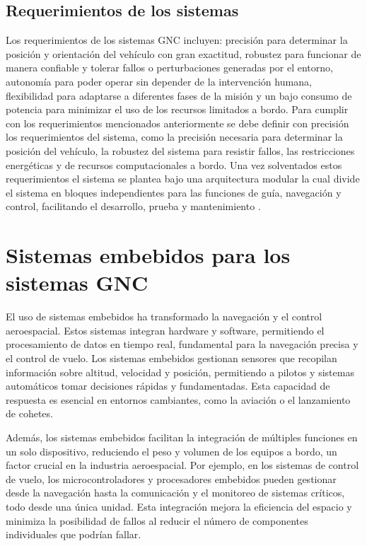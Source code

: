 \subsection{Requerimientos de los sistemas}

Los requerimientos de los sistemas GNC incluyen: precisión para determinar la posición y orientación del vehículo con gran exactitud, robustez para funcionar de manera confiable y tolerar fallos o perturbaciones generadas por el entorno, autonomía para poder operar sin depender de la intervención humana, flexibilidad para adaptarse a diferentes fases de la misión y un bajo consumo de potencia para minimizar el uso de los recursos limitados a bordo. 
Para cumplir con los requerimientos mencionados anteriormente se debe definir con precisión los requerimientos del sistema, como la precisión necesaria para determinar la posición del vehículo, la robustez del sistema para resistir fallos, las restricciones energéticas y de recursos computacionales a bordo. Una vez solventados estos requerimientos el sistema se plantea bajo una arquitectura modular la cual divide el sistema en bloques independientes para las funciones de guía, navegación y control, facilitando el desarrollo, prueba y mantenimiento \cite{AEM2017}. 


\section{Sistemas embebidos para los sistemas GNC}

El uso de sistemas embebidos ha transformado la navegación y el control aeroespacial. Estos sistemas integran hardware y software, permitiendo el procesamiento de datos en tiempo real, fundamental para la navegación precisa y el control de vuelo. Los sistemas embebidos gestionan sensores que recopilan información sobre altitud, velocidad y posición, permitiendo a pilotos y sistemas automáticos tomar decisiones rápidas y fundamentadas. Esta capacidad de respuesta es esencial en entornos cambiantes, como la aviación o el lanzamiento de cohetes. \cite{Castao2014EstimacinDP}

Además, los sistemas embebidos facilitan la integración de múltiples funciones en un solo dispositivo, reduciendo el peso y volumen de los equipos a bordo, un factor crucial en la industria aeroespacial. Por ejemplo, en los sistemas de control de vuelo, los microcontroladores y procesadores embebidos pueden gestionar desde la navegación hasta la comunicación y el monitoreo de sistemas críticos, todo desde una única unidad. Esta integración mejora la eficiencia del espacio y minimiza la posibilidad de fallos al reducir el número de componentes individuales que podrían fallar. \cite{Culp1993GuidanceAC}

